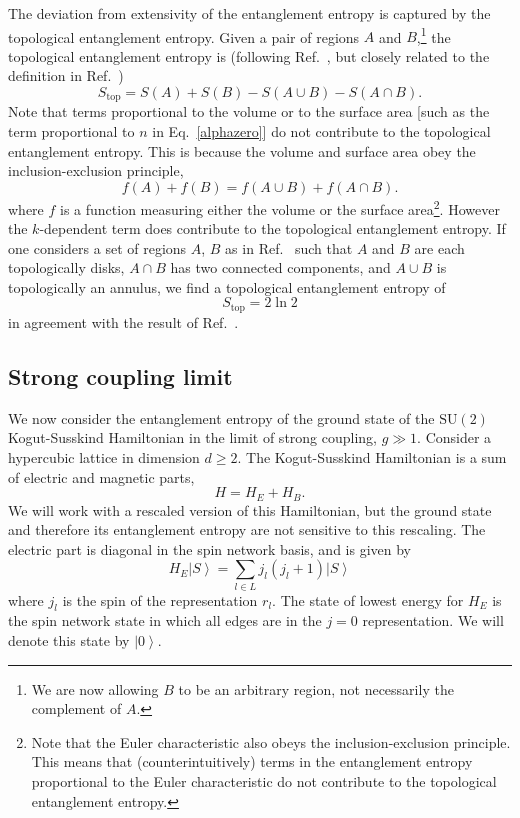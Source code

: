 \documentclass[aps,prd,twocolumn,showpacs,groupedaddress,nofootinbib,letterpaper]{revtex4}
\newcommand{\ket}[1]{\left\vert#1\right\rangle}
\begin{document}
The deviation from extensivity of the entanglement entropy is captured by the topological entanglement entropy.
Given a pair of regions $A$ and $B$,\footnote{We are now allowing $B$ to be an arbitrary region, not necessarily the complement of $A$.} the topological entanglement entropy is (following Ref.~\cite{Levin2006}, but closely related to the definition in Ref.~\cite{Kitaev2005})
\begin{equation}
S_\text{top} = S(A) + S(B) - S(A \cup B) - S(A \cap B).
\end{equation}
Note that terms proportional to the volume or to the surface area [such as the term proportional to $n$ in Eq.~\eqref{alphazero}] do not contribute to the topological entanglement entropy.
This is because the volume and surface area obey the inclusion-exclusion principle,
\begin{equation}
f(A) + f(B) = f(A \cup B) + f(A \cap B).
\end{equation}
where $f$ is a function measuring either the volume or the surface area\footnote{Note that the Euler characteristic also obeys the inclusion-exclusion principle.
This means that (counterintuitively) terms in the entanglement entropy proportional to the Euler characteristic do not contribute to the topological entanglement entropy.}.
However the $k$-dependent term does contribute to the topological entanglement entropy.
If one considers a set of regions $A$, $B$ as in Ref.~\cite{Levin2006} such that $A$ and $B$ are each topologically disks, $A \cap B$ has two connected components, and $A \cup B$ is topologically an annulus, we find a topological entanglement entropy of
\begin{equation}
S_\text{top} = 2 \ln 2
\end{equation}
in agreement with the result of Ref.~\cite{Levin2006}.

\subsection{Strong coupling limit}

We now consider the entanglement entropy of the ground state of the $\text{SU}(2)$ Kogut-Susskind Hamiltonian \cite{Kogut1975} in the limit of strong coupling, $g \gg 1$.
Consider a hypercubic lattice in dimension $d \geq 2$.
The Kogut-Susskind Hamiltonian is a sum of electric and magnetic parts,
\begin{equation}
H = H_E + H_B.
\end{equation}
We will work with a rescaled version of this Hamiltonian, but the ground state and therefore its entanglement entropy are not sensitive to this rescaling.
The electric part is diagonal in the spin network basis, and is given by
\begin{equation}
H_E \ket{S} = 
\sum_{l \in L} j_l (j_l + 1) \ket{S}
\end{equation}
where $j_l$ is the spin of the representation $r_l$.
The state of lowest energy for $H_E$ is the spin network state in which all edges are in the $j=0$ representation.
We will denote this state by $\ket{0}$.
\end{document}
